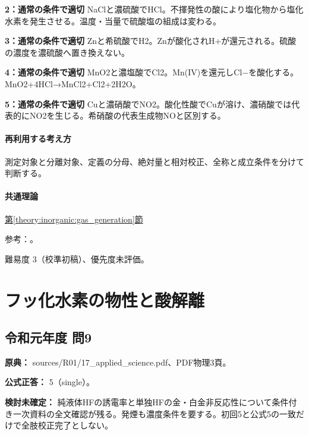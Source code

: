 \noindent\textbf{2：通常の条件で適切} NaClと濃硫酸でHCl。不揮発性の酸により塩化物から塩化水素を発生させる。温度・当量で硫酸塩の組成は変わる。\par

\noindent\textbf{3：通常の条件で適切} Znと希硫酸でH2。Znが酸化されH+が還元される。硫酸の濃度を濃硫酸へ置き換えない。\par

\noindent\textbf{4：通常の条件で適切} MnO2と濃塩酸でCl2。Mn(IV)を還元しCl−を酸化する。MnO2+4HCl→MnCl2+Cl2+2H2O。\par

\noindent\textbf{5：通常の条件で適切} Cuと濃硝酸でNO2。酸化性酸でCuが溶け、濃硝酸では代表的にNO2を生じる。希硝酸の代表生成物NOと区別する。\par

\paragraph{再利用する考え方} 測定対象と分離対象、定義の分母、絶対量と相対校正、全称と成立条件を分けて判断する。

\paragraph{共通理論} \hyperref[theory:inorganic:gas_generation]{第\ref*{theory:inorganic:gas_generation}節}

\par 参考：\cite{analysis49_co_ref,inorganic_halogen_ref}。

\par 難易度 3（校準初稿）、優先度未評価。

\section{フッ化水素の物性と酸解離}

\subsection{令和元年度 問9}
\label{q:r01-reg-applied-09}

\noindent\textbf{原典：} sources/R01/17\_applied\_science.pdf、PDF物理3頁。

\textbf{公式正答：} 5（single）。

\par\textbf{検討未確定：} 純液体HFの誘電率と単独HFの金・白金非反応性について条件付き一次資料の全文確認が残る。発煙も濃度条件を要する。初回5と公式5の一致だけで全肢校正完了としない。


